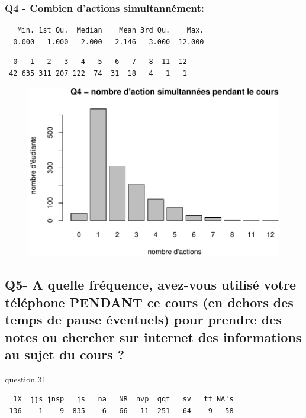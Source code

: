 \documentclass[]{article}
\begin{document}
\subsubsection{Q4 - Combien d'actions
simultannément:}\label{q4---combien-dactions-simultannement}

\begin{verbatim}
   Min. 1st Qu.  Median    Mean 3rd Qu.    Max. 
  0.000   1.000   2.000   2.146   3.000  12.000 
\end{verbatim}

\begin{verbatim}
  0   1   2   3   4   5   6   7   8  11  12 
 42 635 311 207 122  74  31  18   4   1   1 
\end{verbatim}

\begin{figure}[htbp]
\centering
\includegraphics{qs_etudiants_files/figure-latex/actions_sim-1.pdf}
\end{figure}

\subsection{Q5- A quelle fréquence, avez-vous utilisé votre téléphone
PENDANT ce cours (en dehors des temps de pause éventuels) pour prendre
des notes ou chercher sur internet des informations au sujet du cours
?}\label{q5--a-quelle-frequence-avez-vous-utilise-votre-telephone-pendant-ce-cours-en-dehors-des-temps-de-pause-eventuels-pour-prendre-des-notes-ou-chercher-sur-internet-des-informations-au-sujet-du-cours}

question 31

\begin{verbatim}
  1X  jjs jnsp   js   na   NR  nvp  qqf   sv   tt NA's 
 136    1    9  835    6   66   11  251   64    9   58 
\end{verbatim}
\end{document}
